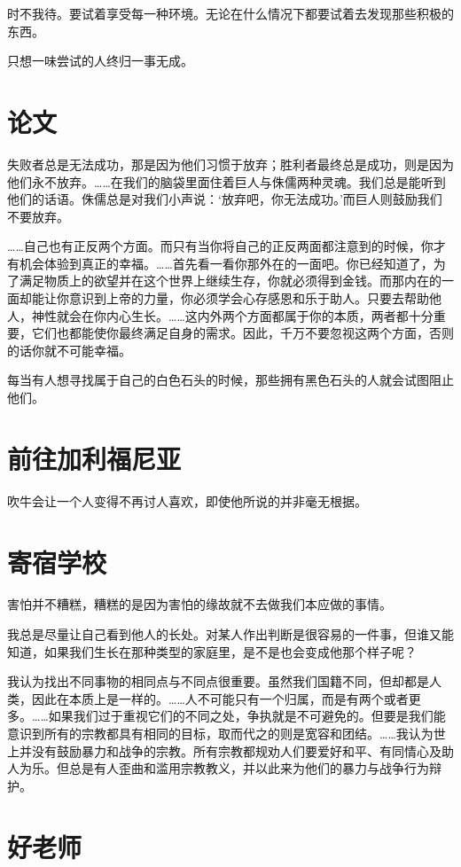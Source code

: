 \documentclass[fontset=founder]{ctexart}
\begin{document}
时不我待。要试着享受每一种环境。无论在什么情况下都要试着去发现那些积极的东西。

只想一味尝试的人终归一事无成。

\section{论文}

失败者总是无法成功，那是因为他们习惯于放弃；胜利者最终总是成功，则是因为他们永不放弃。……在我们的脑袋里面住着巨人与侏儒两种灵魂。我们总是能听到他们的话语。侏儒总是对我们小声说：‘放弃吧，你无法成功。’而巨人则鼓励我们不要放弃。

……自己也有正反两个方面。而只有当你将自己的正反两面都注意到的时候，你才有机会体验到真正的幸福。……首先看一看你那外在的一面吧。你已经知道了，为了满足物质上的欲望并在这个世界上继续生存，你就必须得到金钱。而那内在的一面却能让你意识到上帝的力量，你必须学会心存感恩和乐于助人。只要去帮助他人，神性就会在你内心生长。……这内外两个方面都属于你的本质，两者都十分重要，它们也都能使你最终满足自身的需求。因此，千万不要忽视这两个方面，否则的话你就不可能幸福。

每当有人想寻找属于自己的白色石头的时候，那些拥有黑色石头的人就会试图阻止他们。

\section{前往加利福尼亚}

吹牛会让一个人变得不再讨人喜欢，即使他所说的并非毫无根据。

\section{寄宿学校}

害怕并不糟糕，糟糕的是因为害怕的缘故就不去做我们本应做的事情。

我总是尽量让自己看到他人的长处。对某人作出判断是很容易的一件事，但谁又能知道，如果我们生长在那种类型的家庭里，是不是也会变成他那个样子呢？

我认为找出不同事物的相同点与不同点很重要。虽然我们国籍不同，但却都是人类，因此在本质上是一样的。……人不可能只有一个归属，而是有两个或者更多。……如果我们过于重视它们的不同之处，争执就是不可避免的。但要是我们能意识到所有的宗教都具有相同的目标，取而代之的则是宽容和团结。……我认为世上并没有鼓励暴力和战争的宗教。所有宗教都规劝人们要爱好和平、有同情心及助人为乐。但总是有人歪曲和滥用宗教教义，并以此来为他们的暴力与战争行为辩护。

\section{好老师}
\end{document}
